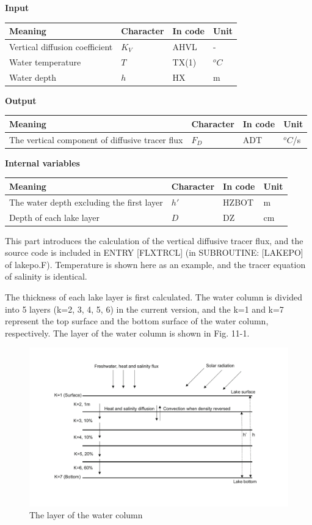 \textbf{Input}

\begin{longtable}[]{@{}llll@{}}
\toprule
Meaning & Character & In code & Unit \\
\midrule
\endhead
Vertical diffusion coefficient & \(K_{V}\) & AHVL & - \\
Water temperature & \(T\) & TX(1) & \(^{o}C\) \\
Water depth & \(h\) & HX & m \\
\bottomrule
\end{longtable}

\textbf{Output}

\begin{longtable}[]{@{}llll@{}}
\toprule
Meaning & Character & In code & Unit \\
\midrule
\endhead
The vertical component of diffusive tracer flux & \(F_{D}\) & ADT & \(^{o}C\)/s \\
\bottomrule
\end{longtable}

\textbf{Internal variables}

\begin{longtable}[]{@{}llll@{}}
\toprule
Meaning & Character & In code & Unit \\
\midrule
\endhead
The water depth excluding the first layer & \(h'\) & HZBOT & m \\
Depth of each lake layer & \(D\) & DZ & cm \\
\bottomrule
\end{longtable}

This part introduces the calculation of the vertical diffusive tracer flux, and the source code is included in ENTRY {[}FLXTRCL{]} (in SUBROUTINE: {[}LAKEPO{]} of lakepo.F). Temperature is shown here
as an example, and the tracer equation of salinity is identical.

The thickness of each lake layer is first calculated. The water column is divided into 5 layers (k=2, 3, 4, 5, 6) in the current version, and the k=1 and k=7 represent the top surface and the bottom
surface of the water column, respectively. The layer of the water column is shown in Fig. 11-1.

\begin{figure}
\centering
\includegraphics{descript/Lake_11-1.pdf}
\caption{The layer of the water column}
\end{figure}


